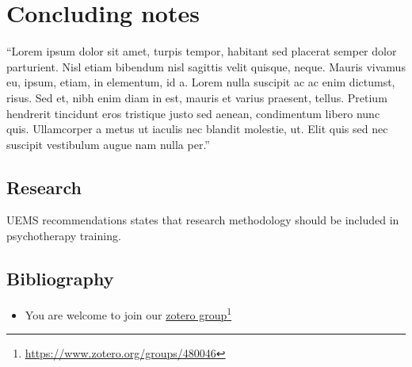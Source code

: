 \documentclass[]{tufte-handout}
\providecommand{\tightlist}{%
  \setlength{\itemsep}{0pt}\setlength{\parskip}{0pt}}
\begin{document}
\section{Concluding notes}\label{concluding-notes}

\justify
[1] ``Lorem ipsum dolor sit amet, turpis tempor, habitant sed placerat
semper dolor parturient. Nisl etiam bibendum nisl sagittis velit
quisque, neque. Mauris vivamus eu, ipsum, etiam, in elementum, id a.
Lorem nulla suscipit ac ac enim dictumst, risus. Sed et, nibh enim diam
in est, mauris et varius praesent, tellus. Pretium hendrerit tincidunt
eros tristique justo sed aenean, condimentum libero nunc quis.
Ullamcorper a metus ut iaculis nec blandit molestie, ut. Elit quis sed
nec suscipit vestibulum augue nam nulla per.''

\newpage

\subsection{Research}\label{research}

UEMS recommendations states that research methodology should be included
in psychotherapy training.

\subsection{Bibliography}\label{bibliography}

\begin{itemize}
\tightlist
\item
  You are welcome to join our
  \href{https://www.zotero.org/groups/480046}{zotero group}\footnote{\url{https://www.zotero.org/groups/480046}}
\end{itemize}
\end{document}
